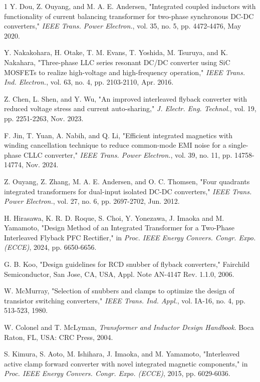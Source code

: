 \documentclass[lettersize,journal]{IEEEtran}
\begin{document}
\begin{thebibliography}{1}
Y. Dou, Z. Ouyang, and M. A. E. Andersen, "Integrated coupled inductors with functionality of current balancing transformer for two-phase synchronous DC-DC converters," \textit{IEEE Trans. Power Electron.}, vol. 35, no. 5, pp. 4472-4476, May 2020.

Y. Nakakohara, H. Otake, T. M. Evans, T. Yoshida, M. Tsuruya, and K. Nakahara, "Three-phase LLC series resonant DC/DC converter using SiC MOSFETs to realize high-voltage and high-frequency operation," \textit{IEEE Trans. Ind. Electron.}, vol. 63, no. 4, pp. 2103-2110, Apr. 2016.

Z. Chen, L. Shen, and Y. Wu, "An improved interleaved flyback converter with reduced voltage stress and current auto-sharing," \textit{J. Electr. Eng. Technol.}, vol. 19, pp. 2251-2263, Nov. 2023.

F. Jin, T. Yuan, A. Nabih, and Q. Li, "Efficient integrated magnetics with winding cancellation technique to reduce common-mode EMI noise for a single-phase CLLC converter," \textit{IEEE Trans. Power Electron.}, vol. 39, no. 11, pp. 14758-14774, Nov. 2024.

Z. Ouyang, Z. Zhang, M. A. E. Andersen, and O. C. Thomsen, "Four quadrants integrated transformers for dual-input isolated DC-DC converters," \textit{IEEE Trans. Power Electron.}, vol. 27, no. 6, pp. 2697-2702, Jun. 2012.

H. Hirasawa, K. R. D. Roque, S. Choi, Y. Yonezawa, J. Imaoka and M. Yamamoto, "Design Method of an Integrated Transformer for a Two-Phase Interleaved Flyback PFC Rectifier," in \textit{Proc. IEEE Energy Convers. Congr. Expo. (ECCE)}, 2024, pp. 6650-6656.

G. B. Koo, "Design guidelines for RCD snubber of flyback converters," Fairchild Semiconductor, San Jose, CA, USA, Appl. Note AN-4147 Rev. 1.1.0, 2006.

W. McMurray, "Selection of snubbers and clamps to optimize the design of transistor switching converters," \textit{IEEE Trans. Ind. Appl.}, vol. IA-16, no. 4, pp. 513-523, 1980.

W. Colonel and T. McLyman, \textit{Transformer and Inductor Design Handbook}. Boca Raton, FL, USA: CRC Press, 2004.

S. Kimura, S. Aoto, M. Ishihara, J. Imaoka, and M. Yamamoto, "Interleaved active clamp forward converter with novel integrated magnetic components," in \textit{Proc. IEEE Energy Convers. Congr. Expo. (ECCE)}, 2015, pp. 6029-6036.

\end{thebibliography}
\end{document}
